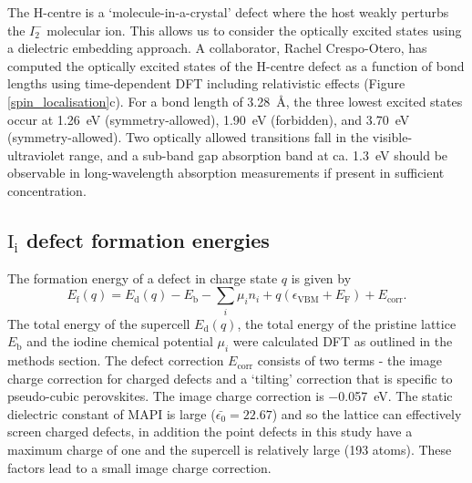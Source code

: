 The H-centre is a `molecule-in-a-crystal' defect where the host weakly perturbs the $I_2^-$ molecular ion.
This allows us to consider the optically excited states using a dielectric embedding approach.
A collaborator, Rachel Crespo-Otero, has computed the optically excited states of the H-centre defect as a function of bond lengths using time-dependent DFT including relativistic effects (Figure \ref{spin_localisation}c).\autocite{Whalley2017b} 
For a bond length of \SI{3.28}{\angstrom}, the three lowest excited states occur at \SI{1.26}{\electronvolt} (symmetry-allowed), \SI{1.90}{\electronvolt} (forbidden), and \SI{3.70}{\electronvolt} (symmetry-allowed). Two optically allowed transitions fall in the visible-ultraviolet range, and a sub-band gap absorption band at ca. \SI{1.3}{\electronvolt} should be observable in long-wavelength absorption measurements if present in sufficient concentration.

\subsection{$\textrm{I}_\textrm{i}$ defect formation energies} \label{ss:dfe}

The formation energy of a defect in charge state $q$ is given by
\begin{equation} \label{eqn_formation_energy}
E_\mathrm{f}(q) = E_\mathrm{d}(q) - E_\mathrm{b} - \sum_i \mu_i n_i + q(\epsilon_\mathrm{VBM}+E_\mathrm{F}) + E_\mathrm{corr}.
\end{equation}
The total energy of the supercell $E_\mathrm{d}(q)$, the total energy of the pristine lattice $E_\mathrm{b}$ and the iodine chemical potential $\mu_i$ were calculated DFT as outlined in the methods section.
The defect correction $E_\mathrm{corr}$ consists of two terms - the image charge correction for charged defects and a `tilting' correction that is specific to pseudo-cubic perovskites.
The image charge correction is \SI{-0.057}{eV}. The static dielectric constant of MAPI is large ($\bar{\epsilon_0}=22.67$)\autocite{Brivio2013} and so the lattice can effectively screen charged defects, in addition the point defects in this study have a maximum charge of one and the supercell is relatively large (193 atoms). These factors lead to a small image charge correction.

